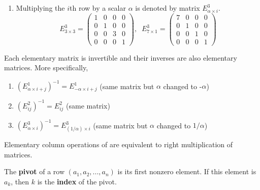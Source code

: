 \begin{definition}
\begin{enumerate}
      \item Multiplying the $i$th row by a scalar $\alpha$ is denoted by matrix $E^3_{\alpha \times i}$. 
      \begin{equation}
        E^3_{3 \times 3} = \begin{pmatrix}
        1&0&0&0 \\ 0&1&0&0 \\ 0&0&3&0 \\ 0&0&0&1
        \end{pmatrix}, \;\; E^3_{7 \times 1} = \begin{pmatrix}
        7&0&0&0 \\ 0&1&0&0 \\ 0&0&1&0 \\ 0&0&0&1
        \end{pmatrix}
      \end{equation}
    \end{enumerate}
  \end{definition}


  \begin{theorem}
    Each elementary matrix is invertible and their inverses are also elementary matrices. More specifically, 
    \begin{enumerate}
      \item $(E^1_{\alpha \times i + j})^{-1} = E^1_{-\alpha \times i + j}$ (same matrix but $\alpha$ changed to -$\alpha$)
      \item $(E^2_{i j})^{-1} = E^2_{i j}$ (same matrix) 
      \item $(E^3_{\alpha \times i})^{-1} = E^{3}_{(1/\alpha) \times i}$ (same matrix but $\alpha$ changed to $1 / \alpha$)
    \end{enumerate}
  \end{theorem}

  Elementary column operations of are equivalent to right multiplication of matrices. 

  \begin{definition}[Pivot]
    The \textbf{pivot} of a row $(a_1, a_2, ..., a_n)$ is its first nonzero element. If this element is $a_k$, then $k$ is the \textbf{index} of the pivot. 
  \end{definition}

